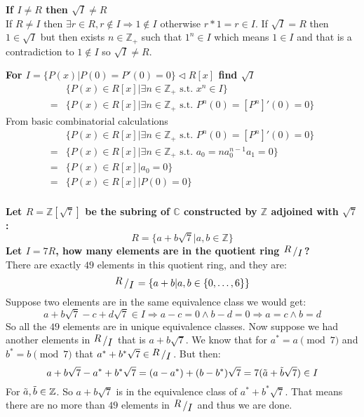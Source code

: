 \documentclass{article}
\theoremstyle{plain}
\DeclareMathOperator{\idealin}{\triangleleft}
\newcommand{\Z}{\mathbb{Z}}
\newcommand{\C}{\mathbb{C}}
\newcommand{\bigslant}[2]
{{\raisebox{.2em}{$#1$}\left/\raisebox{-.2em}{$#2$}\right.}}
\begin{document}
	\newpage
	
	\textbf{If $I \neq R$ then $\sqrt{I} \neq R$} \\
	If $R\neq I$ then $\exists r\in R,r\notin I \Rightarrow 1\notin I$ 
	otherwise $r*1=r\in I$. If $\sqrt{I}=R$ then $1\in\sqrt{I}$ but then 
	exists $n\in\Z_+$ such that $1^n\in I$ which means $1\in I$ and that is a 
	contradiction to $1\notin I$ so $\sqrt{I}\neq R$.
	
	\newpage
	
	\textbf{For $I = \{P(x) \vert P(0)=P'(0)=0\} \idealin R[x]$ find 
	$\sqrt{I}$} \\
	\begin{align*}
		&\{P(x)\in R[x] \vert \exists n\in\Z_+ \text{ s.t. } x^n\in I\} \\
		=&\{P(x)\in R[x] \vert \exists n\in\Z_+ \text{ s.t. } 
		P^n(0) = [P^n]'(0) = 0\}
	\end{align*}
	From basic combinatorial calculations
	\begin{align*}
		&\{P(x)\in R[x] \vert \exists n\in\Z_+ \text{ s.t. } 
		P^n(0) = [P^n]'(0) = 0\} \\
		=&\{P(x)\in R[x] \vert \exists n\in\Z_+ \text{ s.t. } 
		a_0 = na_0^{n-1}a_1 = 0\} \\
		=&\{P(x)\in R[x] \vert a_0 = 0\} \\
		=&\{P(x)\in R[x] \vert P(0) = 0\} \\
	\end{align*}
	
	\newpage
	
	\textbf{
	Let $R = \Z[\sqrt{7}]$ be the subring of $\C$ constructed by $\Z$ adjoined
	with $\sqrt{7}$:
	\[
		R = \{a + b\sqrt{7} \vert a,b\in\Z \}
	\]
	Let $I = 7R$, how many elements are in the quotient ring 
	$\bigslant{R}{I}$?} \\
    There are exactly $49$ elements in this quotient ring, and
    they are:
    \[
        \bigslant{R}{I} = \{a+b \vert a,b\in\{0,\dots,6\}\}
    \]
    Suppose two elements are in the same equivalence class we would
    get:
    \[
    a+b\sqrt{7} - c+d\sqrt{7} \in I \Rightarrow
    a-c = 0 \land b-d = 0 \Rightarrow
    a = c \land b = d
    \]
    So all the $49$ elements are in unique equivalence classes.
    Now suppose we had another elements in $\bigslant{R}{I}$
    that is $a+b\sqrt{7}$. We know that for $a^\ast = a\pmod{7}$
    and $b^\ast = b\pmod{7}$ that $a^\ast+b^\ast\sqrt{7} \in \bigslant{R}
    {I}$. But then:
    \[
    a+b\sqrt{7} - a^\ast+b^\ast\sqrt{7} = 
    (a-a^\ast)+(b-b^\ast)\sqrt{7} = 7(\Tilde{a}+\Tilde{b}\sqrt{7})
    \in I
    \]
    For $\Tilde{a},\Tilde{b}\in \Z$. So $a+b\sqrt{7}$ is in the
    equivalence class of $a^\ast+b^\ast\sqrt{7}$. That means there
    are no more than $49$ elements in $\bigslant{R}{I}$ and thus we are done.
    
\end{document}
